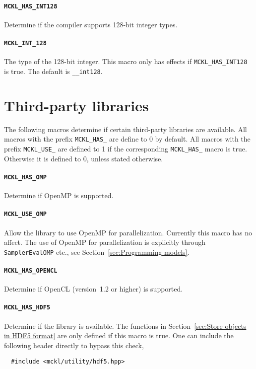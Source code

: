 \paragraph{\texttt{MCKL\_HAS\_INT128}} Determine if the compiler supports
128-bit integer types.

\paragraph{\texttt{MCKL\_INT\_128}} The type of the 128-bit integer. This macro
only has effects if \verb|MCKL_HAS_INT128| is true. The default is
\verb|__int128|.

\section{Third-party libraries}
\label{sec:Third-party libraries}

The following macros determine if certain third-party libraries are available.
All macros with the prefix \verb|MCKL_HAS_| are define to 0 by default. All
macros with the prefix \verb|MCKL_USE_| are defined to 1 if the corresponding
\verb|MCKL_HAS_| macro is true. Otherwise it is defined to 0, unless stated
otherwise.

\paragraph{\texttt{MCKL\_HAS\_OMP}} Determine if OpenMP is supported.

\paragraph{\texttt{MCKL\_USE\_OMP}} Allow the library to use OpenMP for
parallelization. Currently this macro has no affect. The use of OpenMP for
parallelization is explicitly through \verb|SamplerEvalOMP| etc., see
Section~\ref{sec:Programming models}.

\paragraph{\texttt{MCKL\_HAS\_OPENCL}} Determine if OpenCL (version~1.2 or
higher) is supported.

\paragraph{\texttt{MCKL\_HAS\_HDF5}} Determine if the \hdf library is
available. The functions in Section~\ref{sec:Store objects in HDF5 format} are
only defined if this macro is true. One can include the following header
directly to bypass this check,
\begin{Verbatim}
  #include <mckl/utility/hdf5.hpp>
\end{Verbatim}

